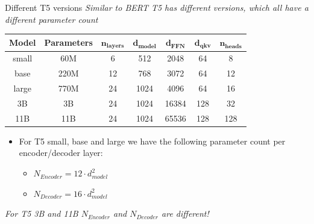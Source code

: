 \begin{frame}{Different T5 versions}
\textit{Similar to BERT T5 has different versions, which all have a different parameter count} 

\hspace{}

\begin{table}[h!]
\centering
\small %
\begin{tabular}{|c|c|c|c|c|c|c|}
\hline
\textbf{Model} & \textbf{Parameters} & $\bm{n_{layers}}$ & $\bm{d_{model}}$ & $\bm{d_{FFN}}$ & $\bm{d_{qkv}}$ & $\bm{n_{heads}}$ \\ \hline
small  & 60M  & 6  & 512  & 2048 & 64 & 8 \\ \hline
base   & 220M & 12 & 768  & 3072 & 64 & 12 \\ \hline
large  & 770M & 24 & 1024 & 4096 & 64 & 16 \\ \hline
3B     & 3B   & 24 & 1024 & 16384 & 128 & 32 \\ \hline
11B    & 11B  & 24 & 1024 & 65536 & 128 & 128 \\ \hline
\end{tabular}
\end{table}

\begin{itemize}
    \item For T5 small, base and large we have the following parameter count per encoder/decoder layer:
    \begin{itemize}
        \item $N_{Encoder} = 12\cdot d_{model}^2$
        \item $N_{Decoder} = 16\cdot d_{model}^2$
    \end{itemize}
\end{itemize}

\hspace{}

\textit{For T5 3B and 11B $N_{Encoder}$ and $N_{Decoder}$ are different!}
    
\end{frame}




